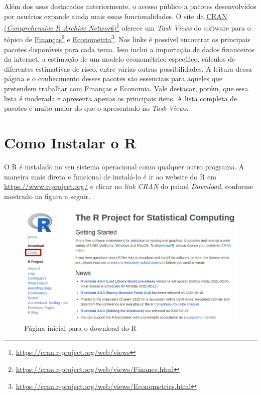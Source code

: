 \documentclass[
  11pt,
]{book}
\begin{document}
Além dos usos destacados anteriormente, o acesso público a pacotes desenvolvidos por usuários expande ainda mais essas funcionalidades. O site da \href{https://cran.r-project.org/web/views}{CRAN (\emph{Comprehensive R Archive Network})}\footnote{\url{https://cran.r-project.org/web/views}} oferece um \emph{Task Views} do software para o tópico de \href{https://cran.r-project.org/web/views/Finance.html}{Finanças}\footnote{\url{https://cran.r-project.org/web/views/Finance.html}} e \href{https://cran.r-project.org/web/views/Econometrics.html}{Econometria}\footnote{\url{https://cran.r-project.org/web/views/Econometrics.html}}. Nos links é possível encontrar os principais pacotes disponíveis para cada tema. Isso inclui a importação de dados financeiros da internet, a estimação de um modelo econométrico específico, cálculos de diferentes estimativas de risco, entre várias outras possibilidades. A leitura dessa página e o conhecimento desses pacotes são essenciais para aqueles que pretendem trabalhar com Finanças e Economia. Vale destacar, porém, que essa lista é moderada e apresenta apenas os principais itens. A lista completa de pacotes é muito maior do que o apresentado no \emph{Task Views}. 

\hypertarget{instalacao}{%
\section{Como Instalar o R}\label{instalacao}}

O R é instalado no seu sistema operacional como qualquer outro programa. A maneira mais direta e funcional de instalá-lo é ir ao website do R em \url{https://www.r-project.org/} e clicar no \emph{link} \emph{CRAN} do painel \emph{Download}, conforme mostrado na figura a seguir.

\begin{figure}[!htbp]

{\centering \includegraphics[width=1\linewidth]{00-text-resources/figs/website_cran_1} 

}

\caption{Página inicial para o download do R}\label{fig:website-cran-1}
\end{figure}
\end{document}
